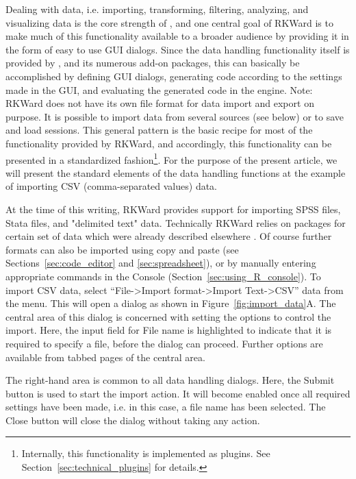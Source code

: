 Dealing with data, i.e. importing, transforming, filtering, analyzing, and visualizing data is the core
strength of , and one central goal of
RKWard is to make much of this functionality available to a broader
audience by providing it in the form of easy to use GUI dialogs. Since
the data handling functionality itself is provided by
, and its numerous add-on packages, this
can basically be accomplished by defining GUI dialogs, generating
 code according to the settings made in
the GUI, and evaluating the generated code in the
 engine. Note: RKWard does not have its
own file format for data import and export on purpose. It is possible
to import data from several sources (see below) or to save and load
 sessions. This general pattern is the
basic recipe for most of the functionality provided by RKWard, and
accordingly, this functionality can be presented in a standardized
fashion\footnote{Internally, this functionality is implemented as
plugins. See Section~\ref{sec:technical_plugins} for details.}. For
the purpose of the present article, we will present the standard
elements of the data handling functions at the example of importing CSV
(comma-separated values) data.

At the time of this writing, RKWard provides support for importing SPSS
files, Stata files, and "delimited text" data. Technically RKWard
relies on  packages for certain set of
data which were already described elsewhere
\citep{Murdoch2002}. Of course further formats can
also be imported using copy and paste (see Sections~\ref{sec:code_editor} and \ref{sec:spreadsheet}), or by
manually entering appropriate  commands in
the  Console (Section~\ref{sec:using_R_console}). To import CSV
data, select ``File->Import format->Import Text->CSV''
data from the menu. This will open a dialog as shown in
Figure~\ref{fig:import_data}A. The central area of this dialog is concerned with setting
the options to control the import. Here, the input field for
File name is highlighted to indicate that
it is required to specify a file, before the dialog can proceed.
Further options are available from tabbed pages of the central area.

The right-hand area is common to all data handling
dialogs. Here, the Submit button is used
to start the import action. It will become enabled once all required
settings have been made, i.e. in this case, a file name has been
selected. The Close button will close the
dialog without taking any action.

